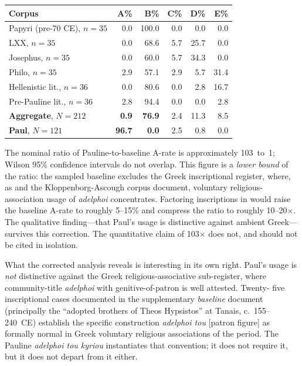 \documentclass[12pt,oneside]{article}
\newcommand{\grk}[1]{\textit{#1}}
\begin{document}
\begin{center}
\small
\begin{tabular}{lrrrrr}
\toprule
Corpus & A\% & B\% & C\% & D\% & E\% \\
\midrule
Papyri (pre-70 CE), $n{=}35$ & 0.0 & 100.0 & 0.0 & 0.0 & 0.0 \\
LXX, $n{=}35$                & 0.0 & 68.6  & 5.7 & 25.7 & 0.0 \\
Josephus, $n{=}35$           & 0.0 & 60.0  & 5.7 & 34.3 & 0.0 \\
Philo, $n{=}35$              & 2.9 & 57.1  & 2.9 & 5.7  & 31.4 \\
Hellenistic lit., $n{=}36$    & 0.0 & 80.6  & 0.0 & 2.8  & 16.7 \\
Pre-Pauline lit., $n{=}36$   & 2.8 & 94.4  & 0.0 & 0.0  & 2.8 \\
\midrule
\textbf{Aggregate}, $N{=}212$ & \textbf{0.9} & \textbf{76.9} & 2.4 & 11.3 & 8.5 \\
\midrule
\textbf{Paul}, $N{=}121$     & \textbf{96.7} & \textbf{0.0} & 2.5 & 0.8 & 0.0 \\
\bottomrule
\end{tabular}
\end{center}

The nominal ratio of Pauline-to-baseline A-rate is approximately
103~to~1; Wilson 95\% confidence intervals do not overlap.  This
figure is a \textit{lower bound} of the ratio: the sampled baseline
excludes the Greek inscriptional register, where, as
\citet{Harland2005} and the Kloppenborg-Ascough \citep{KloppenborgAscough2011}
corpus document, voluntary religious-association usage of
\grk{adelphoi} concentrates.  Factoring inscriptions in would raise
the baseline A-rate to roughly 5--15\% and compress the ratio to
roughly 10--20$\times$.  The qualitative finding---that Paul's
usage is distinctive against ambient Greek---survives this
correction.  The quantitative claim of 103$\times$ does not, and
should not be cited in isolation.

What the corrected analysis reveals is interesting in its own
right.  Paul's usage is \textit{not} distinctive against the
Greek religious-associative sub-register, where community-title
\grk{adelphoi} with genitive-of-patron is well attested.  Twenty-
five inscriptional cases documented in the supplementary
\textit{baseline} document (principally the \enquote{adopted
brothers of Theos Hypsistos} at Tanais, c.~155--240~CE) establish
the specific construction \grk{adelphoi tou} [patron figure] as
formally normal in Greek voluntary religious associations of the
period.  The Pauline \grk{adelphoi tou kyriou} instantiates that
convention; it does not require it, but it does not depart from
it either.
\end{document}
